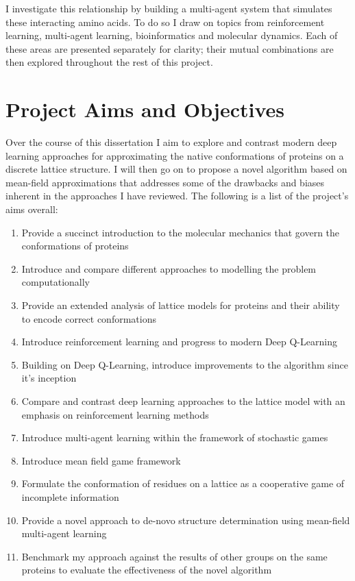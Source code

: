 I investigate this relationship by building a multi-agent system that simulates
these interacting amino acids. To do so I draw on topics from reinforcement learning,
multi-agent learning, bioinformatics and molecular dynamics. Each of these areas 
are presented separately for clarity; their mutual combinations are then explored 
throughout the rest of this project.
\section{Project Aims and Objectives}
   Over the course of this dissertation I aim to explore and contrast
   modern deep learning approaches for approximating the native conformations
   of proteins on a discrete lattice structure. I will then go on to propose
   a novel algorithm based on mean-field approximations that addresses 
   some of the drawbacks and biases inherent in the approaches I have reviewed.
   \linebreak
   The following is a list of the project's aims overall:
   \begin{enumerate}
      \item Provide a succinct introduction to the molecular mechanics that govern the conformations of proteins
      \item Introduce and compare different approaches to modelling the problem computationally
      \item Provide an extended analysis of lattice models for proteins and their ability to encode correct conformations
      \item Introduce reinforcement learning and progress to modern Deep Q-Learning
      \item Building on Deep Q-Learning, introduce improvements to the algorithm since it's inception
      \item Compare and contrast deep learning approaches to the lattice model with an emphasis on reinforcement learning methods
      \item Introduce multi-agent learning within the framework of stochastic games
      \item Introduce mean field game framework
      \item Formulate the conformation of residues on a lattice as a cooperative game of incomplete information
      \item Provide a novel approach to de-novo structure determination using mean-field multi-agent learning
      \item Benchmark my approach against the results of other groups on the same proteins to evaluate the effectiveness of the novel algorithm
   \end{enumerate}
